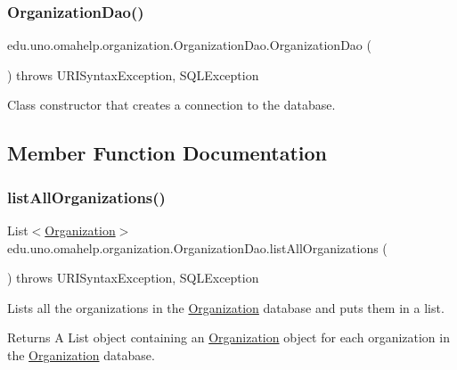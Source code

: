 \subsubsection{\texorpdfstring{Organization\+Dao()}{OrganizationDao()}}
{\footnotesize\ttfamily edu.\+uno.\+omahelp.\+organization.\+Organization\+Dao.\+Organization\+Dao (\begin{DoxyParamCaption}{ }\end{DoxyParamCaption}) throws U\+R\+I\+Syntax\+Exception, S\+Q\+L\+Exception}

Class constructor that creates a connection to the database. 

\subsection{Member Function Documentation}
\mbox{\label{classedu_1_1uno_1_1omahelp_1_1organization_1_1_organization_dao_a92b3c1daf59ccd4abdc594dae27cbbd0}} 
\subsubsection{\texorpdfstring{list\+All\+Organizations()}{listAllOrganizations()}}
{\footnotesize\ttfamily List$<$\mbox{\hyperlink{classedu_1_1uno_1_1omahelp_1_1organization_1_1_organization}{Organization}}$>$ edu.\+uno.\+omahelp.\+organization.\+Organization\+Dao.\+list\+All\+Organizations (\begin{DoxyParamCaption}{ }\end{DoxyParamCaption}) throws U\+R\+I\+Syntax\+Exception, S\+Q\+L\+Exception}

Lists all the organizations in the \mbox{\hyperlink{classedu_1_1uno_1_1omahelp_1_1organization_1_1_organization}{Organization}} database and puts them in a list.

\begin{DoxyReturn}{Returns}
A List object containing an \mbox{\hyperlink{classedu_1_1uno_1_1omahelp_1_1organization_1_1_organization}{Organization}} object for each organization in the \mbox{\hyperlink{classedu_1_1uno_1_1omahelp_1_1organization_1_1_organization}{Organization}} database. 
\end{DoxyReturn}

